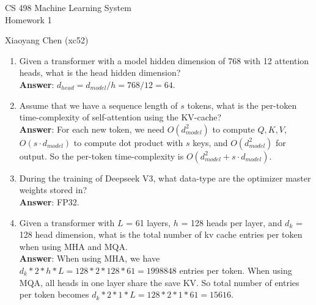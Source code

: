 \documentclass[11pt]{article}
\begin{document}
\begin{minipage}[t]{0.5\textwidth}
\Large
CS 498 Machine Learning System \\
Homework 1
\end{minipage}
\hfill
\begin{minipage}[t]{0.5\textwidth}
\begin{flushright}
\Large
Xiaoyang Chen (xc52)
\end{flushright}
\end{minipage}

\hrulefill
\begin{enumerate}

\item[1.] Given a transformer with a model hidden dimension of 768 with 12 attention heads, what is the head hidden dimension? \\
\textbf{Answer}: $d_{head} = d_{model} / h = 768 / 12 = 64$. \\

\item[2.] Assume that we have a sequence length of $s$ tokens, what is the per-token time-complexity of self-attention using the KV-cache? \\
\textbf{Answer}: For each new token, we need $O(d_{model}^2)$ to compute $Q, K, V$, $O(s \cdot d_{model})$ to compute dot product with $s$ keys, and $O(d_{model}^2)$ for output. So the per-token time-complexity is $O(d_{model}^2 + s \cdot d_{model})$. \\

\item[3.]  During the training of Deepseek V3, what data-type are the optimizer master weights stored in? \\
\textbf{Answer}: FP32. \\

\item[4.]  Given a transformer with $L$ = 61 layers, $h$ = 128 heads per layer, and $d_k$ = 128 head dimension, what is the total number of kv cache entries per token when using MHA and MQA. \\
\textbf{Answer}: When using MHA, we have $d_k * 2 * h * L = 128 * 2 * 128* 61 = 1998848$ entries per token. When using MQA, all heads in one layer share the save KV. So total number of entries per token becomes $d_k * 2 * 1 * L = 128 * 2 * 1* 61 = 15616$. \\


\end{enumerate}
\end{document}
